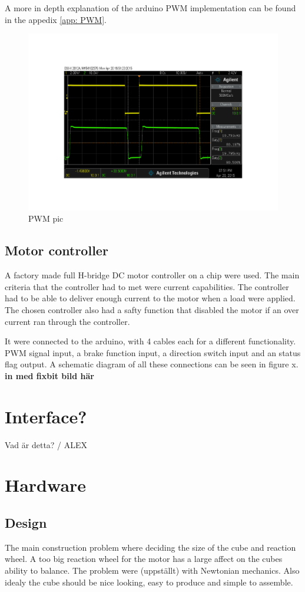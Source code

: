\documentclass[a4paper,11pt]{kth-mag}
\begin{document}
A more in depth explanation of the arduino PWM implementation can be found in the appedix \ref{app: PWM}.
\begin{figure}[!htb]
\centering
\includegraphics[width = \textwidth]{PWMpic.pdf}
\caption{PWM pic}
\label{Fig: PWMscope}
\end{figure} 

\subsection{Motor controller}
A factory made full H-bridge DC motor controller on a chip were used. The main criteria that the controller had to met were current capabilities. The controller had to be able to deliver enough current to the motor when a load were applied. The chosen controller also had a safty function that disabled the motor if an over current ran through the controller.

It were connected to the arduino, with 4 cables each for a different functionality. PWM signal input, a brake function input, a direction switch input and an status flag output. A schematic diagram of all these connections can be seen in figure x.
\textbf{in med fixbit bild här}
\section{Interface?}
Vad är detta? / ALEX
\section{Hardware}

\subsection{Design}
The main construction problem where deciding the size of the cube and reaction wheel. A too big reaction wheel for the motor has a large affect on the cubes ability to balance. The problem were (uppställt) with Newtonian mechanics.
Also idealy the cube should be nice looking, easy to produce and simple to assemble. 
\end{document}
